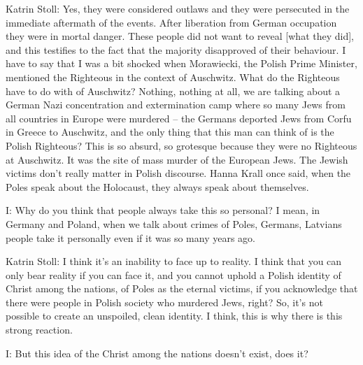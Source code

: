 Katrin Stoll: Yes, they were considered outlaws and they were persecuted in the immediate aftermath of the events. After liberation from German occupation they were in mortal danger. These people did not want to reveal [what they did], and this testifies to the fact that the majority disapproved of their behaviour. I have to say that I was a bit shocked when Morawiecki, the Polish Prime Minister, mentioned the Righteous in the context of Auschwitz. What do the Righteous have to do with of Auschwitz? Nothing, nothing at all, we are talking about a German Nazi concentration and extermination camp where so many Jews from all countries in Europe were murdered – the Germans deported Jews from Corfu in Greece to Auschwitz, and the only thing that this man can think of is the Polish Righteous? This is so absurd, so grotesque because they were no Righteous at Auschwitz. It was the site of mass murder of the European Jews. The Jewish victims don’t really matter in Polish discourse. Hanna Krall once said, when the Poles speak about the Holocaust, they always speak about themselves. 

 

I: Why do you think that people always take this so personal? I mean, in Germany and Poland, when we talk about crimes of Poles, Germans, Latvians people take it personally even if it was so many years ago. 

 

Katrin Stoll: I think it’s an inability to face up to reality. I think that you can only bear reality if you can face it, and you cannot uphold a Polish identity of Christ among the nations, of Poles as the eternal victims, if you acknowledge that there were people in Polish society who murdered Jews, right? So, it’s not possible to create an unspoiled, clean identity. I think, this is why there is this strong reaction.  

 

I: But this idea of the Christ among the nations doesn’t exist, does it? 

 

